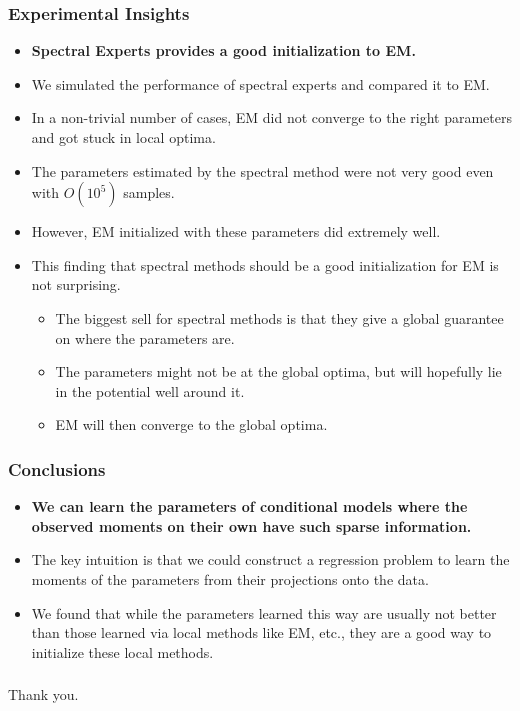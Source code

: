 \documentclass[xcolor={svgnames}]{beamer}
\begin{document}
\begin{frame}
  \frametitle{Experimental Insights}
  \begin{itemize}
    \item {\bf Spectral Experts provides a good initialization to EM.}
      \item We simulated the performance of spectral experts and compared it to EM. 
\item In a non-trivial number of cases, EM did not converge to the right parameters and got stuck in local optima.
\item The parameters estimated by the spectral method were not very good even with $O(10^5)$ samples.
\item However, EM initialized with these parameters did extremely well. 
\item This finding that spectral methods should be a good initialization for EM is not surprising.
  \begin{itemize}
    \item The biggest sell for spectral methods is that they give a global guarantee on where the parameters are.
    \item The parameters might not be at the global optima, but will hopefully lie in the potential well around it.
    \item EM will then converge to the global optima.
  \end{itemize}
  \end{itemize}
\end{frame}

\begin{frame}
  \frametitle{Conclusions}
  \begin{itemize}
    \item {\bf We can learn the parameters of conditional models where the observed moments on their own have such sparse information.}
    \item The key intuition is that we could construct a regression problem to learn the moments of the parameters from their projections onto the data.
    \item We found that while the parameters learned this way are usually not better than those learned via local methods like EM, etc., they are a good way to initialize these local methods.
  \end{itemize}
\end{frame}

\begin{frame}
  \frametitle{}
  Thank you.
\end{frame}
\end{document}
